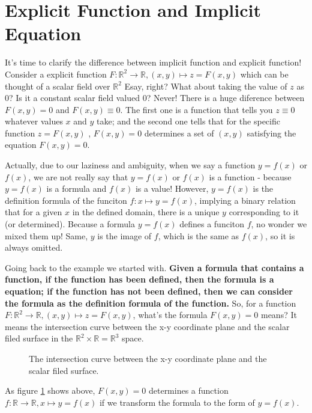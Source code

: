 \section{Explicit Function and Implicit Equation}

It's time to clarify the difference between implicit function and explicit function!
Consider a explicit function $F: \mathbb{R}^2\to\mathbb{R}, (x,y)\mapsto z=F(x,y)$ which can be thought of a scalar field over $\mathbb{R}^2$
Esay, right? What about taking the value of $z$ as $0$? Is it a constant scalar field valued $0$? Never! There is a huge diference between $F(x,y)=0$ and $F(x,y)\equiv 0$.
The first one is a function that tells you $z\equiv 0$ whatever values $x$ and $y$ take; and the second one tells that for the specific function $z=F(x,y)$
, $F(x,y)=0$ determines a set of $(x,y)$ satisfying the equation $F(x,y)=0$.

Actually, due to our laziness and ambiguity, when we say a function $y=f(x)$ or $f(x)$, we are not really say that $y=f(x)$ or $f(x)$ is a function -
because $y=f(x)$ is a formula and $f(x)$ is a value! However, $y=f(x)$ is the definition formula of the funciton $f:x\mapsto y=f(x)$,
implying a binary relation that for a given $x$ in the defined domain, there is a unique $y$ corresponding to it (or determined).
Because a formula $y=f(x)$ defines a funciton $f$, no wonder we mixed them up! Same, $y$ is the image of $f$, which is the same as $f(x)$,
so it is always omitted.

Going back to the example we started with. \textbf{Given a formula that contains a function, if the function has been defined, then the formula is a equation;
if the function has not been defined, then we can consider the formula as the definition formula of the function.}
So, for a function $F: \mathbb{R}^2\to\mathbb{R}, (x,y)\mapsto z=F(x,y)$, what's the formula $F(x,y)=0$ means?
It means the intersection curve between the x-y coordinate plane and the scalar filed surface in the $\mathbb{R}^2\times\mathbb{R}=\mathbb{R}^3$ space.

\begin{figure}[!ht]
	\centering
	
	\caption{The intersection curve between the x-y coordinate plane and the scalar filed surface.}
	\label{intersection}
\end{figure}

As figure \ref{intersection} shows above, $F(x,y)=0$ determines a function $f: \mathbb{R}\to\mathbb{R}, x\mapsto y=f(x)$ if we transform the formula to the form of $y=f(x)$.


